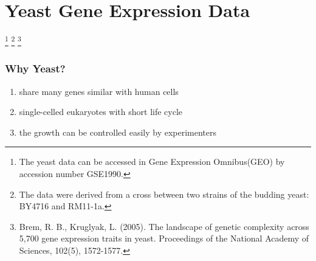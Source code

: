 \section{Yeast Gene Expression Data}
\begin{frame}
    \sectionpage 
    \footnote[1]{The yeast data can be accessed in Gene Expression Omnibus(GEO) by accession number GSE1990.}
    \footnote[2]{The data were derived from a cross between two strains of the budding yeast: BY4716 and RM11-1a.}
    \footnote[3]{Brem, R. B., Kruglyak, L. (2005). The landscape of genetic complexity across 5,700 gene expression traits in yeast. Proceedings of the National Academy of Sciences, 102(5), 1572-1577.}
\end{frame}

\begin{frame}\frametitle{Why Yeast?}
    \begin{enumerate}
        \item share many genes similar with human cells
        
        \item single-celled eukaryotes with short life cycle
        
        \item the growth can be controlled easily by experimenters
    \end{enumerate}
\end{frame}

